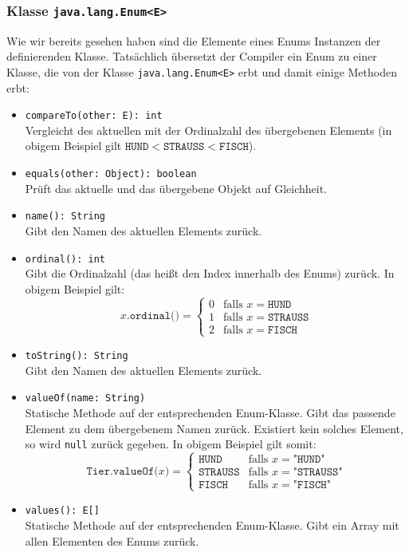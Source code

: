 	\subsubsection{Klasse \texttt{java.lang.Enum<E>}}
		Wie wir bereits gesehen haben sind die Elemente eines Enums Instanzen der definierenden Klasse. Tatsächlich übersetzt der Compiler ein Enum zu einer Klasse, die von der Klasse \lstinline|java.lang.Enum<E>| erbt und damit einige Methoden erbt:
		\begin{itemize}
			\item \lstinline|compareTo(other: E): int| \\ Vergleicht des aktuellen mit der Ordinalzahl des übergebenen Elements (in obigem Beispiel gilt \( \texttt{HUND} < \texttt{STRAUSS} < \texttt{FISCH} \)).
			\item \lstinline|equals(other: Object): boolean| \\ Prüft das aktuelle und das übergebene Objekt auf Gleichheit.
			\item \lstinline|name(): String| \\ Gibt den Namen des aktuellen Elements zurück.
			\item \lstinline|ordinal(): int| \\ Gibt die Ordinalzahl (das heißt den Index innerhalb des Enums) zurück. In obigem Beispiel gilt:
				\begin{equation}
					x.\texttt{ordinal()} =
						\begin{cases*}
							0 & \text{falls } x = \texttt{HUND}    \\
							1 & \text{falls } x = \texttt{STRAUSS} \\
							2 & \text{falls } x = \texttt{FISCH}
						\end{cases*}
				\end{equation}
			\item \lstinline|toString(): String| \\ Gibt den Namen des aktuellen Elements zurück.
			\item \lstinline|valueOf(name: String)| \\ Statische Methode auf der entsprechenden Enum-Klasse. Gibt das passende Element zu dem übergebenem Namen zurück. Existiert kein solches Element, so wird \lstinline|null| zurück gegeben. In obigem Beispiel gilt somit:
				\begin{equation}
					\texttt{Tier.valueOf(}x\texttt{)} =
						\begin{cases*}
							\texttt{HUND}    & \text{falls } x = \texttt{"HUND"}    \\
							\texttt{STRAUSS} & \text{falls } x = \texttt{"{}STRAUSS"} \\
							\texttt{FISCH}   & \text{falls } x = \texttt{"FISCH"}
						\end{cases*}
				\end{equation}
			\item \lstinline|values(): E[]| \\ Statische Methode auf der entsprechenden Enum-Klasse. Gibt ein Array mit allen Elementen des Enums zurück.
		\end{itemize}
	
